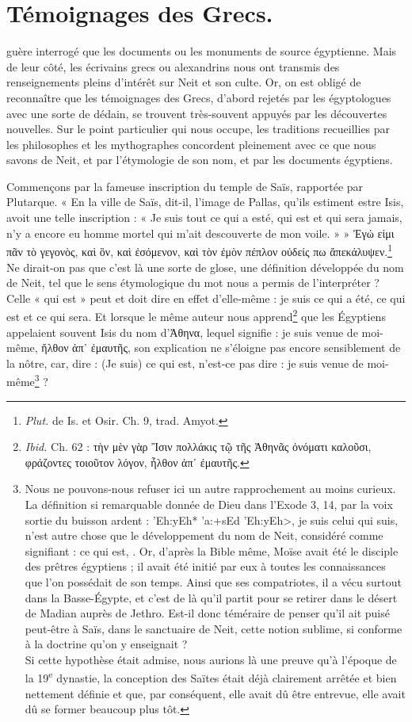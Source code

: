 \documentclass[letterpaper,twocolumn,openany,nodeprecatedcode]{dndbook}
\newcommand*\hieroAAAQ{}
\begin{document}
\section{Témoignages des Grecs.}
 guère interrogé que les documents ou les monuments de source égyptienne. Mais de leur côté, les écrivains grecs ou alexandrins nous ont transmis des renseignements pleins d'intérêt sur Neit et son culte. Or, on est obligé de reconnaître que les témoignages des Grecs, d'abord rejetés par les égyptologues avec une sorte de dédain, se trouvent très-souvent appuyés par les découvertes nouvelles. Sur le point particulier qui nous occupe, les traditions recueillies par les philosophes et les mythographes concordent pleinement avec ce que nous savons de Neit, et par l'étymologie de son nom, et par les documents égyptiens.

Commençons par la fameuse inscription du temple de Saïs, rapportée par Plutarque. « En la ville de Saïs, dit-il, l'image de Pallas, qu'ils estiment estre Isis, avoit une telle inscription : « Je suis tout ce qui a esté, qui est et qui sera jamais, n'y a encore eu homme mortel qui m'ait descouverte de mon voile. » » Ἐγώ εἰμι πᾶν τὸ γεγονὸς, καὶ ὃν, καὶ ἐσόμενον, καὶ τὸν ἐμὸν πέπλον οὐδείς πω ἄπεκάλυψεν.\footnote{\emph{Plut.} de Is. et Osir. Ch. 9, trad. Amyot.} Ne dirait-on pas que c'est là une sorte de glose, une définition développée du nom de Neit, tel que le sens étymologique du mot nous a permis de l'interpréter ? Celle « qui est » peut et doit dire en effet d'elle-même : je suis ce qui a été, ce qui est et ce qui sera. Et lorsque le même auteur nous apprend\footnote{\emph{Ibid.} Ch. 62 : τὴν μὲν γὰρ Ἲσιν πολλάκις τῷ τῆς Ἀθηνᾶς ὀνόματι καλοῦσι, φράζοντες τοιοῦτον λόγον, ἦλθον ἀπ᾿ ἐμαυτῆς.} que les Égyptiens appelaient souvent Isis du nom d'Ἀθηνα, lequel signifie : je suis venue de moi-même, ἤλθον ἀπ᾽ ἐμαυτῆς, son explication ne s'éloigne pas encore sensiblement de la nôtre, car, dire : (Je suis) ce qui est, n'est-ce pas dire : je suis venue de moi-même\footnote{Nous ne pouvons-nous refuser ici un autre rapprochement au moins curieux. La définition si remarquable donnée de Dieu dans l'Exode 3, 14, par la voix sortie du buisson ardent : \foreignlanguage{hebrew}{\<'Eh:yEh* 'a:+sEd 'Eh:yEh>}, je suis celui qui suis, n'est autre chose que le développement du nom de Neit, considéré comme signifiant : ce qui est, $\hieroAAAQ$. Or, d'après la Bible même, Moïse avait été le disciple des prêtres égyptiens ; il avait été initié par eux à toutes les connaissances que l'on possédait de son temps. Ainsi que ses compatriotes, il a vécu surtout dans la Basse-Égypte, et c'est de là qu'il partit pour se retirer dans le désert de Madian auprès de Jethro. Est-il donc téméraire de penser qu'il ait puisé peut-être à Saïs, dans le sanctuaire de Neit, cette notion sublime, si conforme à la doctrine qu'on y enseignait ?\\\hspace*{5mm}Si cette hypothèse était admise, nous aurions là une preuve qu'à l'époque de la 19\textsuperscript{e} dynastie, la conception des Saïtes était déjà clairement arrêtée et bien nettement définie et que, par conséquent, elle avait dû être entrevue, elle avait dû se former beaucoup plus tôt.} ?
\end{document}
